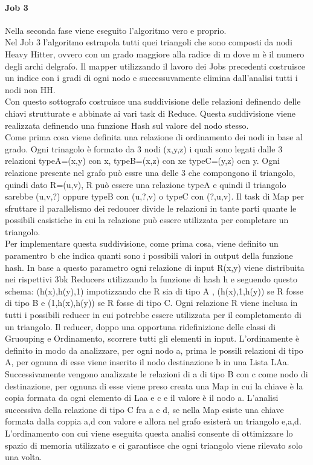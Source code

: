 \documentclass[paper=a4, fontsize=11pt]{scrartcl}	%
\numberwithin{equation}{section}															%
\numberwithin{figure}{section}																%
\numberwithin{table}{section}																%
\begin{document}
\paragraph{Job 3}
Nella seconda fase viene eseguito l'algoritmo vero e proprio.\\
Nel Job 3 l'algoritmo estrapola tutti quei triangoli che sono composti da nodi Heavy Hitter, ovvero con un grado maggiore alla radice di m dove m è il numero degli archi delgrafo.
Il mapper utilizzando il lavoro dei Jobs precedenti costruisce un indice con i gradi di ogni nodo e successuvamente elimina dall'analisi tutti i nodi non HH.\\
Con questo sottografo costruisce una suddivisione delle relazioni definendo delle chiavi strutturate e abbinate ai vari task di Reduce. Questa suddivisione viene realizzata definendo una funzione Hash sul valore del nodo stesso.\\
Come prima cosa viene definita una relazione di ordinamento dei nodi in base al grado.
Ogni trinagolo è formato da  3 nodi (x,y,z) i quali sono legati dalle 3 relazioni typeA=(x,y) con x\lly, typeB=(x,z) con x\llz e typeC=(y,z) ocn y\llz. Ogni relazione presente nel grafo può essre una delle 3 che compongono il triangolo, quindi dato R=(u,v), R può essere una relazione typeA e quindi  il triangolo sarebbe (u,v,?) oppure typeB con (u,?,v) o typeC con (?,u,v).
Il task di Map per sfruttare il parallelismo dei redoucer divide le relazioni in tante parti quante le possibili casistiche in cui la relazione può essere utilizzata per completare un triangolo.\\
Per implementare questa suddivisione, come prima cosa, viene definito un paramentro b che indica quanti sono i possibili valori in output della funzione hash. In base a questo parametro ogni relazione di input R(x,y) viene distribuita nei rispettivi 3bk Reducers utilizzando la funzione di hash h e seguendo questo schema: (h(x),h(y),1\lei\llb) impotizzando che R sia di tipo A , (h(x),1\lei\leb,h(y)) se R fosse di tipo B e (1\lei\leb,h(x),h(y)) se R fosse di tipo C. Ogni relazione R viene inclusa in tutti i possibili reducer in cui potrebbe essere utilizzata per il completamento di un triangolo.
Il reducer, doppo una opportuna ridefinizione delle classi di Gruouping e Ordinamento, scorrere tutti gli elementi in input. L'ordinamente è definito in modo da analizzare, per ogni nodo a, prima le possili relazioni di tipo A, per ognuna di esse viene inserito il nodo destinazione b in una Lista LAa. Successivamente vengono analizzate le relazioni di a di tipo B con c come nodo di destinazione, per ognuna di esse viene preso creata una Map in cui la chiave è la copia formata da ogni elemento di Laa e c e il valore è il nodo a.
L'analisi successiva della relazione di tipo C fra a e d, se nella Map esiste una chiave formata dalla coppia a,d con valore e allora nel grafo esisterà un triangolo e,a,d.
L'ordinamento con cui viene eseguita questa analisi consente di ottimizzare lo spazio di memoria utilizzato e ci garantisce che ogni triangolo viene rilevato solo una volta.
\end{document}
